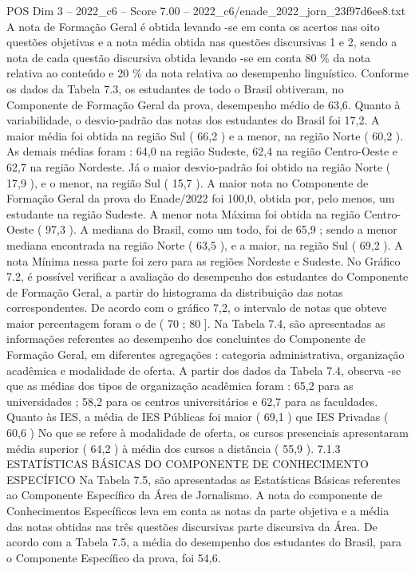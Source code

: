 \begin{textsample}{POS Dim 3 – 2022\_c6 – Score 7.00 – 2022\_c6/enade\_2022\_jorn\_23f97d6ee8.txt}
A nota de Formação Geral é obtida levando -se em conta os acertos nas oito questões objetivas e a nota média obtida nas questões discursivas 1 e 2, sendo a nota de cada questão discursiva obtida levando -se em conta 80 \% da nota relativa ao conteúdo e 20 \% da nota relativa ao desempenho linguístico.
Conforme os dados da Tabela 7.3, os estudantes de todo o Brasil obtiveram, no Componente de Formação Geral da prova, desempenho médio de 63,6.
Quanto à variabilidade, o desvio-padrão das notas dos estudantes do Brasil foi 17,2.
A maior média foi obtida na região Sul ( 66,2 ) e a menor, na região Norte ( 60,2 ).
As demais médias foram : 64,0 na região Sudeste, 62,4 na região Centro-Oeste e 62,7 na região Nordeste.
Já o maior desvio-padrão foi obtido na região Norte ( 17,9 ), e o menor, na região Sul ( 15,7 ).
A maior nota no Componente de Formação Geral da prova do Enade/2022 foi 100,0, obtida por, pelo menos, um estudante na região Sudeste.
A menor nota Máxima foi obtida na região Centro-Oeste ( 97,3 ).
A mediana do Brasil, como um todo, foi de 65,9 ; sendo a menor mediana encontrada na região Norte ( 63,5 ), e a maior, na região Sul ( 69,2 ).
A nota Mínima nessa parte foi zero para as regiões Nordeste e Sudeste.
No Gráfico 7.2, é possível verificar a avaliação do desempenho dos estudantes do Componente de Formação Geral, a partir do histograma da distribuição das notas correspondentes.
De acordo com o gráfico 7,2, o intervalo de notas que obteve maior percentagem foram o de ( 70 ; 80 ].
Na Tabela 7.4, são apresentadas as informações referentes ao desempenho dos concluintes do Componente de Formação Geral, em diferentes agregações : categoria administrativa, organização acadêmica e modalidade de oferta.
A partir dos dados da Tabela 7.4, observa -se que as médias dos tipos de organização acadêmica foram : 65,2 para as universidades ; 58,2 para os centros universitários e 62,7 para as faculdades.
Quanto às IES, a média de IES Públicas foi maior ( 69,1 ) que IES Privadas ( 60,6 ) No que se refere à modalidade de oferta, os cursos presenciais apresentaram média superior ( 64,2 ) à média dos cursos a distância ( 55,9 ). 7.1.3 ESTATÍSTICAS BÁSICAS DO COMPONENTE DE CONHECIMENTO ESPECÍFICO Na Tabela 7.5, são apresentadas as Estatísticas Básicas referentes ao Componente Específico da Área de Jornalismo.
A nota do componente de Conhecimentos Específicos leva em conta as notas da parte objetiva e a média das notas obtidas nas três questões discursivas parte discursiva da Área.
De acordo com a Tabela 7.5, a média do desempenho dos estudantes do Brasil, para o Componente Específico da prova, foi 54,6.

\end{textsample}
